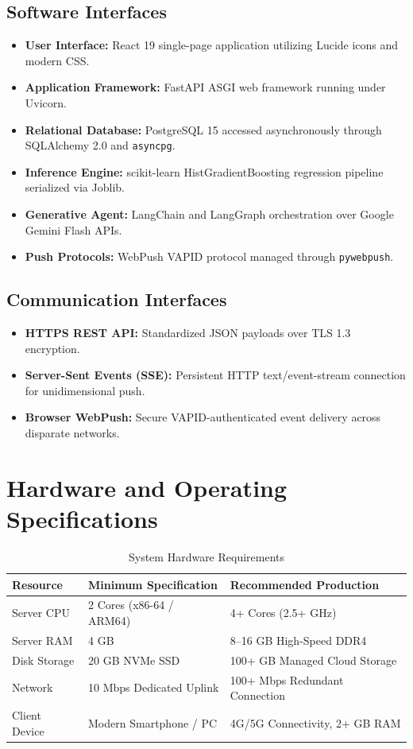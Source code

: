 \subsection{Software Interfaces}
\begin{itemize}
  \item \textbf{User Interface:} React 19 single-page application utilizing Lucide icons and modern CSS.
  \item \textbf{Application Framework:} FastAPI ASGI web framework running under Uvicorn.
  \item \textbf{Relational Database:} PostgreSQL 15 accessed asynchronously through SQLAlchemy 2.0 and \texttt{asyncpg}.
  \item \textbf{Inference Engine:} scikit-learn HistGradientBoosting regression pipeline serialized via Joblib.
  \item \textbf{Generative Agent:} LangChain and LangGraph orchestration over Google Gemini Flash APIs.
  \item \textbf{Push Protocols:} WebPush VAPID protocol managed through \texttt{pywebpush}.
\end{itemize}

\subsection{Communication Interfaces}
\begin{itemize}
  \item \textbf{HTTPS REST API:} Standardized JSON payloads over TLS 1.3 encryption.
  \item \textbf{Server-Sent Events (SSE):} Persistent HTTP text/event-stream connection for unidimensional push.
  \item \textbf{Browser WebPush:} Secure VAPID-authenticated event delivery across disparate networks.
\end{itemize}

\section{Hardware and Operating Specifications}

\begin{table}[H]
\centering
\caption{System Hardware Requirements}
\label{tab:hw}
\renewcommand{\arraystretch}{1.2}
\begin{tabular}{|p{3.2cm}|p{5.0cm}|p{5.0cm}|}
\hline
\textbf{Resource} & \textbf{Minimum Specification} & \textbf{Recommended Production} \\ \hline
Server CPU & 2 Cores (x86-64 / ARM64) & 4+ Cores (2.5+ GHz) \\ \hline
Server RAM & 4 GB & 8--16 GB High-Speed DDR4 \\ \hline
Disk Storage & 20 GB NVMe SSD & 100+ GB Managed Cloud Storage \\ \hline
Network & 10 Mbps Dedicated Uplink & 100+ Mbps Redundant Connection \\ \hline
Client Device & Modern Smartphone / PC & 4G/5G Connectivity, 2+ GB RAM \\ \hline
\end{tabular}
\end{table}

